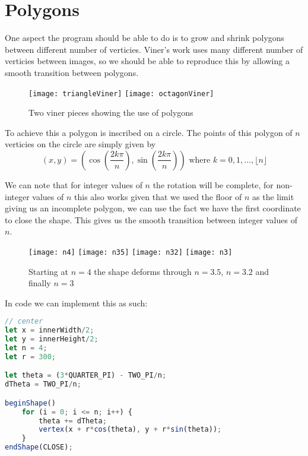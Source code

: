 \section{Polygons}
\label{Polygons}
One aspect the program should be able to do is to grow and shrink polygons
between different number of verticies. Viner's work uses many different number
of verticies between images, so we should be able to reproduce this by allowing
a smooth transition between polygons. 

\begin{figure}[H]
    \centering
    \texttt{[image: triangleViner]}
    \hspace{0.2cm}
    \texttt{[image: octagonViner]}
    \caption{Two viner pieces showing the use of polygons}
\end{figure}


To achieve this a polygon is inscribed on a circle. The points of this polygon
of $n$ verticies on the circle are simply given by $$(x, y) = (\cos(\frac{2k
\pi}{n}), \sin(\frac{2k\pi}{n})) \text{ where } k = 0, 1, \ldots, \lfloor n
\rfloor$$ 

We can note that for integer values of $n$ the rotation will be complete, for
non-integer values of $n$ this also works given that we used the floor of $n$ as
the limit giving us an incomplete polygon, we can use the fact we have the first
coordinate to close the shape. This gives us the smooth transition between
integer values of $n$.

\begin{figure}[H]
    \centering
    \texttt{[image: n4]}
    \texttt{[image: n35]}
    \texttt{[image: n32]}
    \texttt{[image: n3]}
    \caption{Starting at $n=4$ the shape deforms through $n=3.5$, $n=3.2$ and
    finally $n=3$}
\end{figure}

In code we can implement this as such:
\begin{lstlisting}[language=JavaScript]
// center
let x = innerWidth/2;
let y = innerHeight/2;
let n = 4;
let r = 300;

let theta = (3*QUARTER_PI) - TWO_PI/n;
dTheta = TWO_PI/n;

beginShape()
    for (i = 0; i <= n; i++) {
        theta += dTheta;
        vertex(x + r*cos(theta), y + r*sin(theta));
    }
endShape(CLOSE);
\end{lstlisting}

